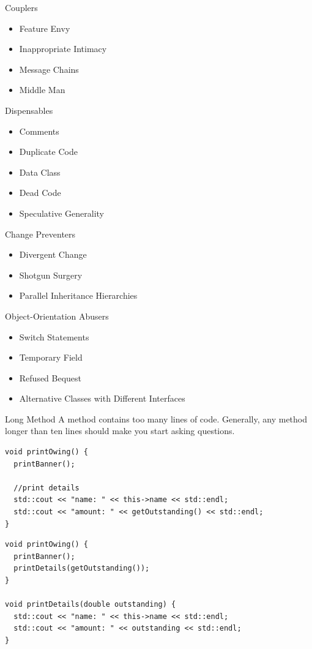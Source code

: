 \documentclass{beamer}
\begin{document}
\begin{frame}{Couplers}
\begin{itemize}
  \item Feature Envy
  \item Inappropriate Intimacy
  \item Message Chains
  \item Middle Man
\end{itemize}
\end{frame}

\begin{frame}{Dispensables}
\begin{itemize}
  \item Comments
  \item Duplicate Code
  \item Data Class
  \item Dead Code
  \item Speculative Generality
\end{itemize}
\end{frame}

\begin{frame}{Change Preventers}
\begin{itemize}
  \item Divergent Change
  \item Shotgun Surgery
  \item Parallel Inheritance Hierarchies
\end{itemize}
\end{frame}

\begin{frame}{Object-Orientation Abusers}
\begin{itemize}
  \item Switch Statements
  \item Temporary Field
  \item Refused Bequest
  \item Alternative Classes with Different Interfaces
\end{itemize}
\end{frame}

\begin{frame}[fragile]{Long Method}
A method contains too many lines of code. Generally, any method longer than ten
lines should make you start asking questions.

\begin{lstlisting}
void printOwing() {
  printBanner();

  //print details
  std::cout << "name: " << this->name << std::endl;
  std::cout << "amount: " << getOutstanding() << std::endl;
}
\end{lstlisting}

\begin{lstlisting}
void printOwing() {
  printBanner();
  printDetails(getOutstanding());
}

void printDetails(double outstanding) {
  std::cout << "name: " << this->name << std::endl;
  std::cout << "amount: " << outstanding << std::endl;
}
\end{lstlisting}
\end{frame}
\end{document}
